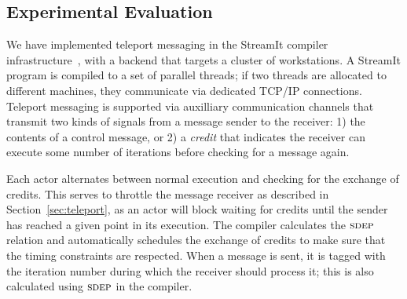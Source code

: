 \subsection{Experimental Evaluation}
\label{sec:evaluation}

We have implemented teleport messaging in the StreamIt compiler
infrastructure~\cite{streamit-asplos}, with a backend that targets a
cluster of workstations.  A StreamIt program is compiled to a set of
parallel threads; if two threads are allocated to different machines,
they communicate via dedicated TCP/IP connections.  Teleport messaging
is supported via auxilliary communication channels that transmit two
kinds of signals from a message sender to the receiver: 1) the contents of
a control message, or 2) a {\it credit} that indicates the receiver
can execute some number of iterations before checking for a message
again.

Each actor alternates between normal execution and checking for the
exchange of credits.  This serves to throttle the message receiver as
described in Section~\ref{sec:teleport}, as an actor will block
waiting for credits until the sender has reached a given point in its
execution.  The compiler calculates the $\textsc{sdep}$ relation and
automatically schedules the exchange of credits to make sure that the
timing constraints are respected.  When a message is sent, it is
tagged with the iteration number during which the receiver should
process it; this is also calculated using $\textsc{sdep}$ in the compiler.




